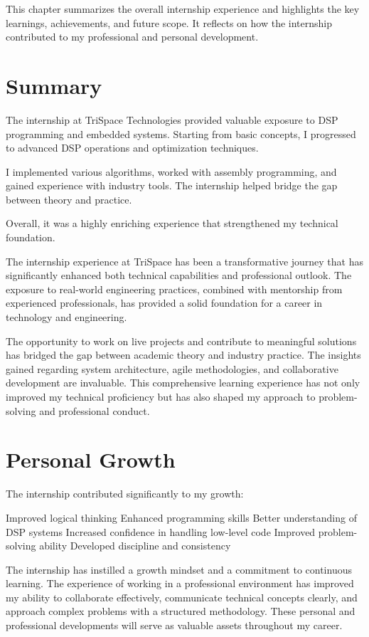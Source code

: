 \documentclass[12pt,a4paper]{report}
\begin{document}
This chapter summarizes the overall internship experience and highlights the key learnings, achievements, and future scope. It reflects on how the internship contributed to my professional and personal development.




\section{Summary}

The internship at TriSpace Technologies provided valuable exposure to DSP programming and embedded systems. Starting from basic concepts, I progressed to advanced DSP operations and optimization techniques.


I implemented various algorithms, worked with assembly programming, and gained experience with industry tools. The internship helped bridge the gap between theory and practice.


Overall, it was a highly enriching experience that strengthened my technical foundation.


The internship experience at TriSpace has been a transformative journey that has significantly enhanced both technical capabilities and professional outlook. The exposure to real-world engineering practices, combined with mentorship from experienced professionals, has provided a solid foundation for a career in technology and engineering.


The opportunity to work on live projects and contribute to meaningful solutions has bridged the gap between academic theory and industry practice. The insights gained regarding system architecture, agile methodologies, and collaborative development are invaluable. This comprehensive learning experience has not only improved my technical proficiency but has also shaped my approach to problem-solving and professional conduct.


\section{Personal Growth}

The internship contributed significantly to my growth:


Improved logical thinking Enhanced programming skills Better understanding of DSP systems Increased confidence in handling low-level code Improved problem-solving ability Developed discipline and consistency


The internship has instilled a growth mindset and a commitment to continuous learning. The experience of working in a professional environment has improved my ability to collaborate effectively, communicate technical concepts clearly, and approach complex problems with a structured methodology. These personal and professional developments will serve as valuable assets throughout my career.
\end{document}
